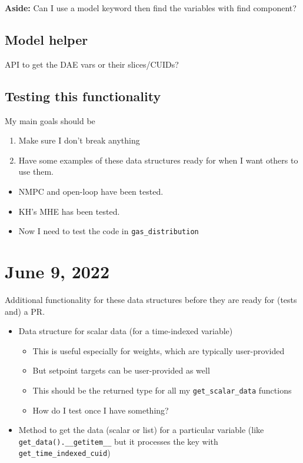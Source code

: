 \documentclass{article}
\begin{document}
\medskip

{\bf Aside:} Can I use a model keyword then find the variables
with find component?

\subsection{Model helper}
API to get the DAE vars or their slices/CUIDs?

\subsection{Testing this functionality}
My main goals should be
\begin{enumerate}
  \item Make sure I don't break anything
  \item Have some examples of these data structures ready for when I want
    others to use them.
\end{enumerate}

\begin{itemize}
  \item NMPC and open-loop have been tested.
  \item KH's MHE has been tested.
  \item Now I need to test the code in \texttt{gas\_distribution}
\end{itemize}

\section{June 9, 2022}
Additional functionality for these data structures before they are
ready for (tests and) a PR.
\begin{itemize}
  \item Data structure for scalar data (for a time-indexed variable)
    \begin{itemize}
      \item This is useful especially for weights, which are typically
	user-provided
      \item But setpoint targets can be user-provided as well
      \item This should be the returned type for all my
	\texttt{get\_scalar\_data} functions
      \item How do I test once I have something?
    \end{itemize}
  \item Method to get the data (scalar or list) for a particular
    variable (like \texttt{get\_data().\_\_getitem\_\_} but it processes
    the key with \texttt{get\_time\_indexed\_cuid})
\end{itemize}
\end{document}
